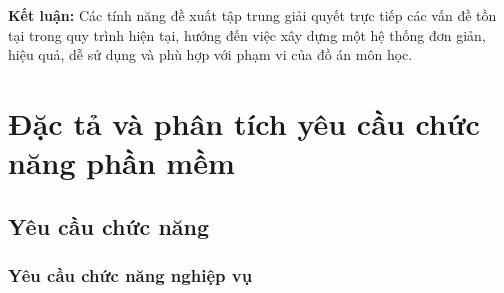\documentclass[12pt,a4paper]{article}
\begin{document}
\textbf{Kết luận:}
Các tính năng đề xuất tập trung giải quyết trực tiếp các vấn đề tồn tại trong quy trình hiện tại, hướng đến việc xây dựng một hệ thống đơn giản, hiệu quả, dễ sử dụng và phù hợp với phạm vi của đồ án môn học.


\section{Đặc tả và phân tích yêu cầu chức năng phần mềm}

\subsection{Yêu cầu chức năng}

\subsubsection{Yêu cầu chức năng nghiệp vụ}
\end{document}
